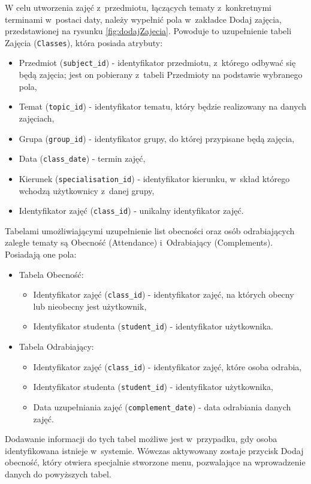 W celu utworzenia zajęć z~przedmiotu, łączących tematy z~konkretnymi terminami w~postaci daty, należy wypełnić pola w~zakładce Dodaj zajęcia, przedstawionej na rysunku \ref{fig:dodajZajecia}. Powoduje to uzupełnienie tabeli Zajęcia (\verb!Classes!), która posiada atrybuty:
\begin{itemize}
\item Przedmiot (\verb!subject_id!) - identyfikator przedmiotu, z~którego odbywać się będą zajęcia; jest on pobierany z~tabeli Przedmioty na podstawie wybranego pola,
\item Temat (\verb!topic_id!) - identyfikator tematu, który będzie realizowany na danych zajęciach,
\item Grupa (\verb!group_id!) - identyfikator grupy, do której przypisane będą zajęcia,
\item Data (\verb!class_date!) - termin zajęć,
\item Kierunek (\verb!specialisation_id!) - identyfikator kierunku, w~skład którego wchodzą użytkownicy z~danej grupy,
\item Identyfikator zajęć (\verb!class_id!) - unikalny identyfikator zajęć.
\end{itemize}
Tabelami umożliwiającymi uzupełnienie list obecności oraz osób odrabiających zaległe tematy są Obecność (Attendance) i~Odrabiający (Complements). Posiadają one pola:
\begin{itemize}
\item Tabela Obecność:
\begin{itemize}
\item Identyfikator zajęć (\verb!class_id!) - identyfikator zajęć, na których obecny lub nieobecny jest użytkownik,
\item Identyfikator studenta (\verb!student_id!) - identyfikator użytkownika.
\end{itemize}
\item Tabela Odrabiający:
\begin{itemize}
\item Identyfikator zajęć (\verb!class_id!) - identyfikator zajęć, które osoba odrabia,
\item Identyfikator studenta (\verb!student_id!) - identyfikator użytkownika,
\item Data uzupełniania zajęć (\verb!complement_date!) - data odrabiania danych zajęć.
\end{itemize}
\end{itemize}

Dodawanie informacji do tych tabel możliwe jest w~przypadku, gdy osoba identyfikowana istnieje w~systemie. Wówczas aktywowany zostaje przycisk Dodaj obecność, który otwiera specjalnie stworzone menu, pozwalające na wprowadzenie danych do powyższych tabel.

